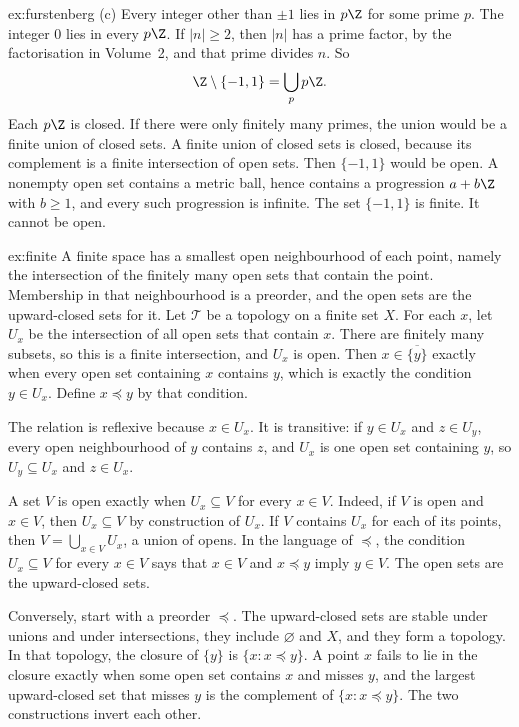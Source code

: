 \begin{solution}{ex:furstenberg}
(c) Every integer other than $\pm1$ lies in $p\Z$ for some prime $p$. The integer $0$ lies in every $p\Z$. If $|n|\ge2$, then $|n|$ has a prime factor, by the factorisation in Volume~2, and that prime divides $n$. So
\[
\Z\setminus\{-1,1\}=\bigcup_p p\Z.
\]
Each $p\Z$ is closed. If there were only finitely many primes, the union would be a finite union of closed sets. A finite union of closed sets is closed, because its complement is a finite intersection of open sets. Then $\{-1,1\}$ would be open. A nonempty open set contains a metric ball, hence contains a progression $a+b\Z$ with $b\ge1$, and every such progression is infinite. The set $\{-1,1\}$ is finite. It cannot be open.
\end{solution}

\begin{solution}{ex:finite}
\idea A finite space has a smallest open neighbourhood of each point, namely the intersection of the finitely many open sets that contain the point. Membership in that neighbourhood is a preorder, and the open sets are the upward-closed sets for it.
\writeup Let $\mathcal T$ be a topology on a finite set $X$. For each $x$, let $U_x$ be the intersection of all open sets that contain $x$. There are finitely many subsets, so this is a finite intersection, and $U_x$ is open. Then $x\in\overline{\{y\}}$ exactly when every open set containing $x$ contains $y$, which is exactly the condition $y\in U_x$. Define $x\preceq y$ by that condition.

The relation is reflexive because $x\in U_x$. It is transitive: if $y\in U_x$ and $z\in U_y$, every open neighbourhood of $y$ contains $z$, and $U_x$ is one open set containing $y$, so $U_y\subseteq U_x$ and $z\in U_x$.

A set $V$ is open exactly when $U_x\subseteq V$ for every $x\in V$. Indeed, if $V$ is open and $x\in V$, then $U_x\subseteq V$ by construction of $U_x$. If $V$ contains $U_x$ for each of its points, then $V=\bigcup_{x\in V}U_x$, a union of opens. In the language of $\preceq$, the condition $U_x\subseteq V$ for every $x\in V$ says that $x\in V$ and $x\preceq y$ imply $y\in V$. The open sets are the upward-closed sets.

Conversely, start with a preorder $\preceq$. The upward-closed sets are stable under unions and under intersections, they include $\varnothing$ and $X$, and they form a topology. In that topology, the closure of $\{y\}$ is $\{x:x\preceq y\}$. A point $x$ fails to lie in the closure exactly when some open set contains $x$ and misses $y$, and the largest upward-closed set that misses $y$ is the complement of $\{x:x\preceq y\}$. The two constructions invert each other.


\end{solution}
